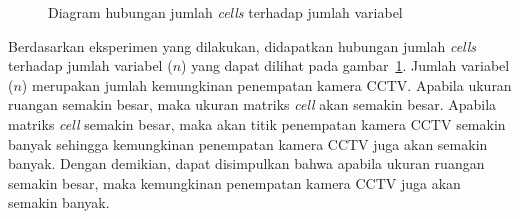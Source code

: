 \begin{figure}[H]
	\centering
	\caption[Diagram hubungan jumlah \textit{cells} terhadap jumlah variabel]{Diagram hubungan jumlah \textit{cells} terhadap jumlah variabel}
	\label{fig:pengujian_1}
\end{figure}

Berdasarkan eksperimen yang dilakukan, didapatkan hubungan jumlah \textit{cells} terhadap jumlah variabel (\(n\)) yang dapat dilihat pada gambar~\ref{fig:pengujian_1}. Jumlah variabel (\(n\)) merupakan jumlah kemungkinan penempatan kamera CCTV. Apabila ukuran ruangan semakin besar, maka ukuran matriks \textit{cell} akan semakin besar. Apabila matriks \textit{cell} semakin besar, maka akan titik penempatan kamera CCTV semakin banyak sehingga kemungkinan penempatan kamera CCTV juga akan semakin banyak. Dengan demikian, dapat disimpulkan bahwa apabila ukuran ruangan semakin besar, maka kemungkinan penempatan kamera CCTV juga akan semakin banyak.

